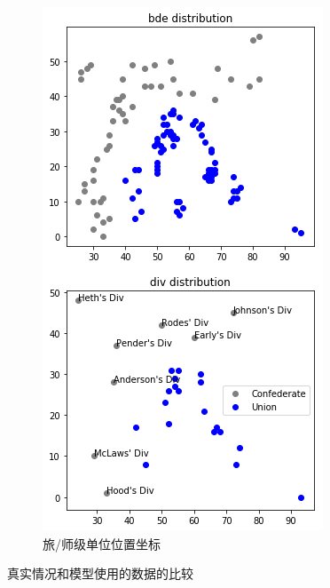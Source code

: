 \documentclass{sicnuthesis}
\begin{document}
\begin{figure}[htb]
\begin{subfigure}[b]{0.49\linewidth}
    \includegraphics[width=\linewidth]{gettysburg-model.png}
    \caption{旅/师级单位位置坐标}
  \end{subfigure}
  \caption{真实情况和模型使用的数据的比较}
  \label{fig:gettysburg}
\end{figure}
\end{document}
